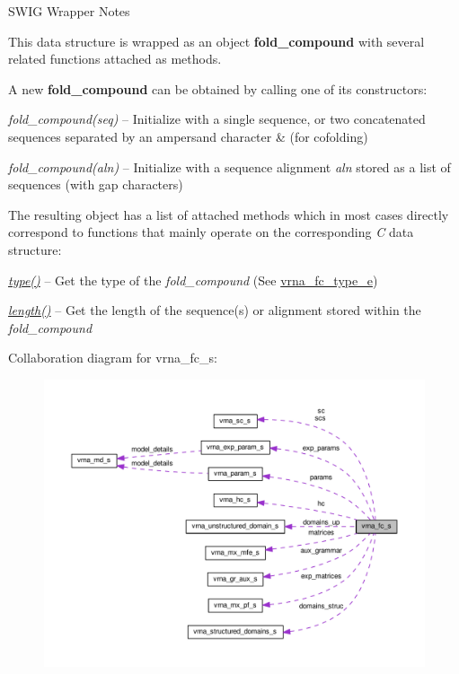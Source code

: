 \begin{DoxyRefDesc}{S\+W\+I\+G Wrapper Notes}
\item[\hyperlink{wrappers__wrappers000033}{S\+W\+I\+G Wrapper Notes}]

This data structure is wrapped as an object {\bfseries fold\+\_\+compound} with several related functions attached as methods.

A new {\bfseries fold\+\_\+compound} can be obtained by calling one of its constructors\+:~\newline

\begin{DoxyItemize}
\item {\itshape fold\+\_\+compound(seq)} -- Initialize with a single sequence, or two concatenated sequences separated by an ampersand character \textquotesingle{}\&\textquotesingle{} (for cofolding)
\item {\itshape fold\+\_\+compound(aln)} -- Initialize with a sequence alignment {\itshape aln} stored as a list of sequences (with gap characters)
\end{DoxyItemize}The resulting object has a list of attached methods which in most cases directly correspond to functions that mainly operate on the corresponding {\itshape C} data structure\+:~\newline

\begin{DoxyItemize}
\item {\itshape \hyperlink{group__fold__compound_ac5eab693deac9a1a40c2a95ac294707c}{type()}} -- Get the type of the {\itshape fold\+\_\+compound} (See \hyperlink{group__fold__compound_ga01a4ff86fa71deaaa5d1abbd95a1447d}{vrna\+\_\+fc\+\_\+type\+\_\+e})
\item {\itshape \hyperlink{group__fold__compound_a95fbfed770b858e50c766505dc4bf998}{length()}} -- Get the length of the sequence(s) or alignment stored within the {\itshape fold\+\_\+compound} 
\end{DoxyItemize}\end{DoxyRefDesc}


Collaboration diagram for vrna\+\_\+fc\+\_\+s\+:
\nopagebreak
\begin{figure}[H]
\begin{center}
\leavevmode
\includegraphics[width=350pt]{structvrna__fc__s__coll__graph}
\end{center}
\end{figure}
